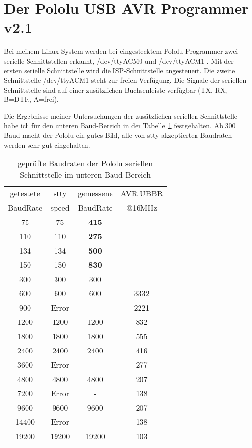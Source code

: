 \section{Der Pololu USB AVR Programmer v2.1}

Bei meinem Linux System werden bei eingestecktem Pololu Programmer zwei serielle
Schnittstellen erkannt, /dev/ttyACM0 und /dev/ttyACM1 .
Mit der ersten serielle Schnittstelle wird die ISP-Schnittstelle angesteuert.
Die zweite Schnittstelle /dev/ttyACM1 steht zur freien Verfügung.
Die Signale der seriellen Schnittstelle sind auf einer zusätzlichen
Buchsenleiste verfügbar (TX, RX, B=DTR, A=frei).

Die Ergebnisse meiner Untersuchungen der zusätzlichen seriellen Schnittstelle 
habe ich für den unteren Baud-Bereich
in der Tabelle~\ref{tab:pololubaudl} festgehalten.
Ab 300 Baud macht der Pololu ein gutes Bild, alle von stty akzeptierten
Baudraten werden sehr gut eingehalten.

\begin{table}[H]
  \begin{center}
    \begin{tabular}{| c | c | c || c |}
    \hline
    getestete  & stty  & gemessene  & AVR UBBR  \\
    BaudRate   & speed & BaudRate  & @16MHz \\
    \hline
    \hline
         75    &  75   & \bf{415} &         \\
    \hline
        110    &  110  & \bf{275}  &         \\
    \hline
        134    &  134  & \bf{500} &        \\
    \hline
        150    & 150   & \bf{830} &         \\
    \hline
        300    & 300   & 300      &        \\
    \hline
        600    & 600   &  600     &   3332  \\
    \hline
        900    & Error &   -      &   2221 \\
    \hline
       1200    & 1200  &  1200    &    832  \\
    \hline
       1800    & 1800  &  1800    &    555 \\
    \hline
       2400    & 2400  &  2400    &    416  \\
    \hline
       3600    & Error &    -     &    277  \\
    \hline
       4800    & 4800  &  4800    &    207  \\
    \hline
       7200    & Error &    -     &    138  \\
    \hline
       9600    & 9600  &   9600   &    207  \\
    \hline
      14400    & Error &    -     &    138  \\
    \hline
      19200    & 19200  &  19200  &    103  \\
    \hline
    \end{tabular}
  \end{center}
  \caption{geprüfte Baudraten der Pololu seriellen Schnittstelle im unteren Baud-Bereich}
  \label{tab:pololubaudl}
\end{table}


